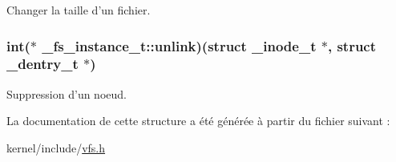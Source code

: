 \-Changer la taille d'un fichier. \hypertarget{struct__fs__instance__t_a38cfd710b2d88ebb388059e90a406db6}{
\subsubsection[{unlink}]{\setlength{\rightskip}{0pt plus 5cm}int($\ast$ {\bf \-\_\-fs\-\_\-instance\-\_\-t\-::unlink})(struct {\bf \-\_\-inode\-\_\-t} $\ast$, struct {\bf \-\_\-dentry\-\_\-t} $\ast$)}}\label{struct__fs__instance__t_a38cfd710b2d88ebb388059e90a406db6}
\-Suppression d'un noeud. 

\-La documentation de cette structure a été générée à partir du fichier suivant \-:\begin{DoxyCompactItemize}
\item 
kernel/include/\hyperlink{vfs_8h}{vfs.\-h}\end{DoxyCompactItemize}
